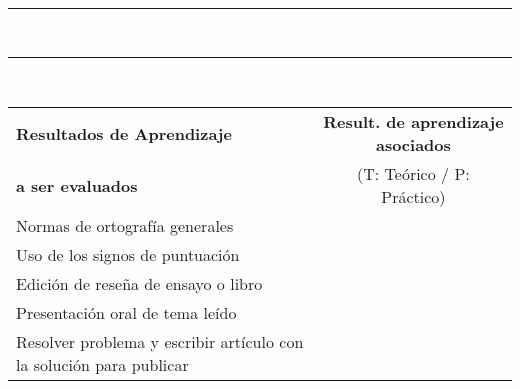 \documentclass{article}
\begin{document}
\noindent\rule[0.8ex]{12.1cm}{0.25pt} \par
{} \\

\noindent\rule[0.8ex]{12.1cm}{0.25pt} \par
{} \\
\begin{tabular}{|m{5.5cm}|c|c|c|c|c|c|} \hline
{\bf Resultados de Aprendizaje} & \multicolumn{6}{c|}{\bf Result. de aprendizaje asociados} \\
{\bf a ser evaluados} & \multicolumn{6}{c|}{(T: Teórico / P: Práctico)} \\ \hline
Normas de ortografía generales & \hspace{1.2em} & \hspace{1.2em} & \hspace{1.2em} & \hspace{1.2em} & \hspace{1.2em} & \hspace{1.2em} \\ \hline
Uso de los signos de puntuación & & & & & & \\ \hline
Edición de reseña de ensayo o libro & & & & & & \\ \hline
Presentación oral de tema leído & & & & & & \\ \hline
Resolver problema y escribir artículo con la solución para publicar & & & & & & \\ \hline
\end{tabular} \\
\end{document}
